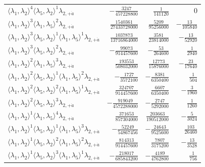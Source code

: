 \begin{longtable}{@{}lrrr@{}}
$\langle\lambda_1,\lambda_2\rangle^{4}\langle\lambda_5,\lambda_2\rangle^{1}\lambda_{2,+\dot a}$ & $-\frac{3247}{457228800}$ & $\frac{1}{141120}$ & $0$ \\
$\langle\lambda_1,\lambda_2\rangle^{3}\langle\lambda_1,\lambda_5\rangle^{2}\lambda_{2,+\dot a}$ & $\frac{1540361}{27433728000}$ & $\frac{5209}{95256000}$ & $-\frac{13}{105840}$ \\
$\langle\lambda_1,\lambda_2\rangle^{3}\langle\lambda_5,\lambda_2\rangle^{1}\langle\lambda_1,\lambda_5\rangle^{1}\lambda_{2,+\dot a}$ & $\frac{1037873}{13716864000}$ & $\frac{3581}{23814000}$ & $-\frac{13}{52920}$ \\
$\langle\lambda_1,\lambda_2\rangle^{3}\langle\lambda_5,\lambda_2\rangle^{2}\lambda_{2,+\dot a}$ & $-\frac{99073}{914457600}$ & $-\frac{53}{264600}$ & $\frac{1}{2940}$ \\
$\langle\lambda_1,\lambda_2\rangle^{2}\langle\lambda_1,\lambda_5\rangle^{3}\lambda_{2,+\dot a}$ & $\frac{193553}{508032000}$ & $\frac{12773}{15876000}$ & $-\frac{23}{17640}$ \\
$\langle\lambda_1,\lambda_2\rangle^{2}\langle\lambda_5,\lambda_2\rangle^{1}\langle\lambda_1,\lambda_5\rangle^{2}\lambda_{2,+\dot a}$ & $-\frac{1727}{3572100}$ & $-\frac{8381}{6350400}$ & $\frac{1}{504}$ \\
$\langle\lambda_1,\lambda_2\rangle^{2}\langle\lambda_5,\lambda_2\rangle^{2}\langle\lambda_1,\lambda_5\rangle^{1}\lambda_{2,+\dot a}$ & $\frac{324707}{914457600}$ & $\frac{6607}{6350400}$ & $-\frac{3}{1960}$ \\
$\langle\lambda_1,\lambda_2\rangle^{2}\langle\lambda_5,\lambda_2\rangle^{3}\lambda_{2,+\dot a}$ & $-\frac{919049}{4572288000}$ & $-\frac{2747}{5292000}$ & $\frac{1}{1260}$ \\
$\langle\lambda_1,\lambda_2\rangle^{1}\langle\lambda_1,\lambda_5\rangle^{4}\lambda_{2,+\dot a}$ & $\frac{371653}{857304000}$ & $\frac{203663}{190512000}$ & $-\frac{5}{3024}$ \\
$\langle\lambda_1,\lambda_2\rangle^{1}\langle\lambda_5,\lambda_2\rangle^{1}\langle\lambda_1,\lambda_5\rangle^{3}\lambda_{2,+\dot a}$ & $-\frac{52249}{54867456}$ & $-\frac{24643}{9525600}$ & $\frac{103}{26460}$ \\
$\langle\lambda_1,\lambda_2\rangle^{1}\langle\lambda_5,\lambda_2\rangle^{2}\langle\lambda_1,\lambda_5\rangle^{2}\lambda_{2,+\dot a}$ & $\frac{814313}{914457600}$ & $\frac{7807}{3175200}$ & $-\frac{13}{3528}$ \\
$\langle\lambda_1,\lambda_2\rangle^{1}\langle\lambda_5,\lambda_2\rangle^{3}\langle\lambda_1,\lambda_5\rangle^{1}\lambda_{2,+\dot a}$ & $-\frac{218017}{685843200}$ & $-\frac{4189}{4762800}$ & $\frac{1}{756}$ \\

\end{longtable}
